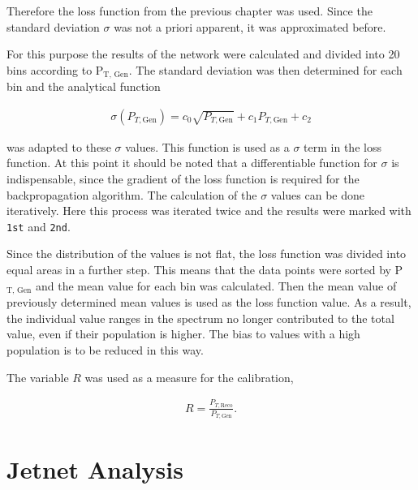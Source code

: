 \documentclass[12pt, a4paper]{thesis}
\begin{document}
Therefore the loss function from the previous chapter was used. Since
the standard deviation \(\sigma\) was not a priori apparent, it was
approximated before.

For this purpose the results of the network were calculated and
divided into 20 bins according to P\(_{\text{T, }\text{Gen}}\). The standard deviation
was then determined for each bin and the analytical function 

\begin{align}
\sigma(P_{T, \text{Gen}})= c_0 \sqrt{P_{T, \text{Gen}}}+c_1 P_{T, \text{Gen}} + c_2
\end{align}

was adapted to these \(\sigma\) values. This function is used as a
\(\sigma\) term in the loss function. At this point it should be noted
that a differentiable function for \(\sigma\) is indispensable, since
the gradient of the loss function is required for the backpropagation
algorithm. The calculation of the \(\sigma\) values can be done
iteratively. Here this process was iterated twice and the results were
marked with \texttt{1st} and \texttt{2nd}.


Since the distribution of the values is not flat, the loss function
was divided into equal areas in a further step. This means that the
data points were sorted by P\(_{\text{T, }\text{Gen}}\) and the mean
value for each bin was calculated. Then the mean value of previously
determined mean values is used as the loss function value. As a
result, the individual value ranges in the spectrum no longer
contributed to the total value, even if their population is
higher. The bias to values with a high population is to be reduced in
this way.

The variable \(R\) was used as a measure for the calibration,

\begin{align}
R = \frac{P_{T, \text{Reco}}}{P_{T, \text{Gen}}}.
\end{align}

\section{Jetnet Analysis}
\label{sec:org03235a3}
\end{document}
